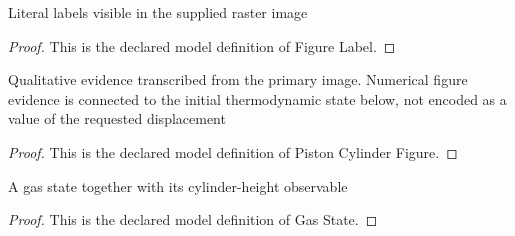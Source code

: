 \begin{definition}
  \label{def:physics:phyx-mini-0447:phyxminiproblems-problemphyxmini0447-figurelabel}
  Literal labels visible in the supplied raster image
\end{definition}
\begin{proof}
  This is the declared model definition of Figure Label.
\end{proof}
\begin{definition}
  \label{def:physics:phyx-mini-0447:phyxminiproblems-problemphyxmini0447-pistoncylinderfigure}
  Qualitative evidence transcribed from the primary image. Numerical figure evidence is connected to the initial thermodynamic state below, not encoded as a value of the requested displacement
\end{definition}
\begin{proof}
  This is the declared model definition of Piston Cylinder Figure.
\end{proof}
\begin{definition}
  \label{def:physics:phyx-mini-0447:phyxminiproblems-problemphyxmini0447-gasstate}
  A gas state together with its cylinder-height observable
\end{definition}
\begin{proof}
  This is the declared model definition of Gas State.
\end{proof}
